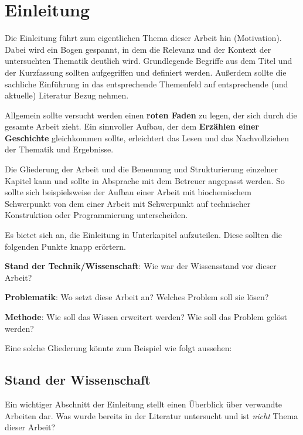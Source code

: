 
\chapter{Einleitung}
\label{chapter:einleitung}

Die Einleitung führt zum eigentlichen Thema dieser Arbeit hin (Motivation). Dabei wird ein Bogen gespannt, in dem die Relevanz und der Kontext der untersuchten Thematik deutlich wird. Grundlegende Begriffe aus dem Titel und der Kurzfassung sollten aufgegriffen und definiert werden. Außerdem sollte die sachliche Einführung in das entsprechende Themenfeld auf entsprechende (und aktuelle) Literatur Bezug nehmen.

Allgemein sollte versucht werden einen \textbf{roten Faden} zu legen, der sich durch die gesamte Arbeit zieht. Ein sinnvoller Aufbau, der dem \textbf{Erzählen einer Geschichte} gleichkommen sollte, erleichtert das Lesen und das Nachvollziehen der Thematik und Ergebnisse.

Die Gliederung der Arbeit und die Benennung und Strukturierung einzelner Kapitel kann und sollte in Absprache mit dem Betreuer angepasst werden. So sollte sich beispielsweise der Aufbau einer Arbeit mit biochemischem Schwerpunkt von dem einer Arbeit mit Schwerpunkt auf technischer Konstruktion oder Programmierung unterscheiden.

Es bietet sich an, die Einleitung in Unterkapitel aufzuteilen. Diese sollten die folgenden Punkte knapp erörtern.

\begin{description}
	\item \textbf{Stand der Technik/Wissenschaft}: Wie war der Wissensstand vor dieser Arbeit?
	\item \textbf{Problematik}: Wo setzt diese Arbeit an? Welches Problem soll sie lösen?
	\item \textbf{Methode}: Wie soll das Wissen erweitert werden? Wie soll das Problem gelöst werden?
\end{description}

Eine solche Gliederung könnte zum Beispiel wie folgt aussehen:

\section{Stand der Wissenschaft}

Ein wichtiger Abschnitt der Einleitung stellt einen Überblick über verwandte Arbeiten dar. Was wurde bereits in der Literatur untersucht und ist \emph{nicht} Thema dieser Arbeit?

